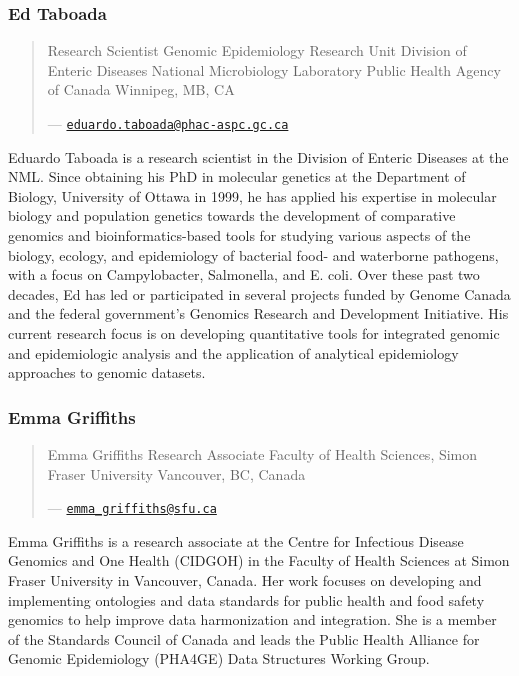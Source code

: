 \documentclass[
]{book}
\begin{document}
\subsubsection{Ed Taboada}\label{ed-taboada}

\begin{quote}
Research Scientist
Genomic Epidemiology Research Unit
Division of Enteric Diseases
National Microbiology Laboratory
Public Health Agency of Canada
Winnipeg, MB, CA

--- \href{mailto:eduardo.taboada@phac-aspc.gc.ca}{\nolinkurl{eduardo.taboada@phac-aspc.gc.ca}}
\end{quote}

Eduardo Taboada is a research scientist in the Division of Enteric Diseases at the NML. Since
obtaining his PhD in molecular genetics at the Department of Biology, University of Ottawa in
1999, he has applied his expertise in molecular biology and population genetics towards the
development of comparative genomics and bioinformatics-based tools for studying various
aspects of the biology, ecology, and epidemiology of bacterial food- and waterborne pathogens,
with a focus on Campylobacter, Salmonella, and E. coli. Over these past two decades, Ed has
led or participated in several projects funded by Genome Canada and the federal government's
Genomics Research and Development Initiative. His current research focus is on developing
quantitative tools for integrated genomic and epidemiologic analysis and the application of
analytical epidemiology approaches to genomic datasets.

\subsubsection{Emma Griffiths}\label{emma-griffiths}

\begin{quote}
Emma Griffiths
Research Associate
Faculty of Health Sciences, Simon Fraser University
Vancouver, BC, Canada

--- \href{mailto:emma_griffiths@sfu.ca}{\nolinkurl{emma\_griffiths@sfu.ca}}
\end{quote}

Emma Griffiths is a research associate at the Centre for Infectious Disease Genomics and One
Health (CIDGOH) in the Faculty of Health Sciences at Simon Fraser University in Vancouver,
Canada. Her work focuses on developing and implementing ontologies and data standards for
public health and food safety genomics to help improve data harmonization and integration. She
is a member of the Standards Council of Canada and leads the Public Health Alliance for
Genomic Epidemiology (PHA4GE) Data Structures Working Group.
\end{document}

